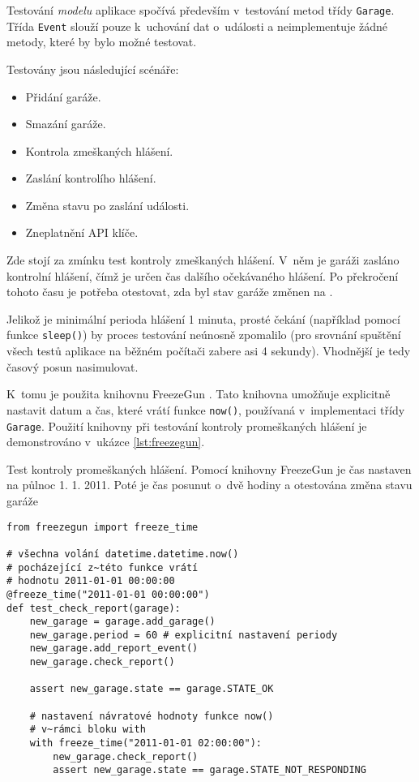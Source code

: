 Testování \textit{modelu} aplikace spočívá především v~testování metod třídy \texttt{Garage}. Třída \texttt{Event} slouží pouze k~uchování dat o~události a neimplementuje žádné metody, které by bylo možné testovat.

Testovány jsou následující scénáře:

\begin{itemize}
    \item Přidání garáže.
    \item Smazání garáže.
    \item Kontrola zmeškaných hlášení.
    \item Zaslání kontrolího hlášení.
    \item Změna stavu po zaslání události.
    \item Zneplatnění API klíče.
\end{itemize}

Zde stojí za zmínku test kontroly zmeškaných hlášení. V~něm je garáži zasláno kontrolní hlášení, čímž je určen čas dalšího očekávaného hlášení. Po překročení tohoto času je potřeba otestovat, zda byl stav garáže změnen na .

Jelikož je minimální perioda hlášení 1 minuta, prosté čekání (například pomocí funkce \texttt{sleep()}) by proces testování neúnosně zpomalilo (pro srovnání spuštění všech testů aplikace na běžném počítači zabere asi 4 sekundy). Vhodnější je tedy časový posun nasimulovat.

K~tomu je použita knihovnu FreezeGun \cite{freezegun}. Tato knihovna umožňuje explicitně nastavit datum a čas, které vrátí funkce \texttt{now()}, používaná v~implementaci třídy \texttt{Garage}. Použití knihovny při testování kontroly promeškaných hlášení je demonstrováno v~ukázce \ref{lst:freezegun}.

\begin{listing}[htbp]
\caption{\label{lst:freezegun} Test kontroly promeškaných hlášení. Pomocí knihovny FreezeGun je čas nastaven na půlnoc 1. 1. 2011. Poté je čas posunut o~dvě hodiny a otestována změna stavu garáže}
\begin{verbatim}
from freezegun import freeze_time

# všechna volání datetime.datetime.now()
# pocházející z~této funkce vrátí
# hodnotu 2011-01-01 00:00:00
@freeze_time("2011-01-01 00:00:00")
def test_check_report(garage):
    new_garage = garage.add_garage()
    new_garage.period = 60 # explicitní nastavení periody
    new_garage.add_report_event()
    new_garage.check_report()

    assert new_garage.state == garage.STATE_OK

    # nastavení návratové hodnoty funkce now()
    # v~rámci bloku with
    with freeze_time("2011-01-01 02:00:00"):
        new_garage.check_report()
        assert new_garage.state == garage.STATE_NOT_RESPONDING
\end{verbatim}
\end{listing}

